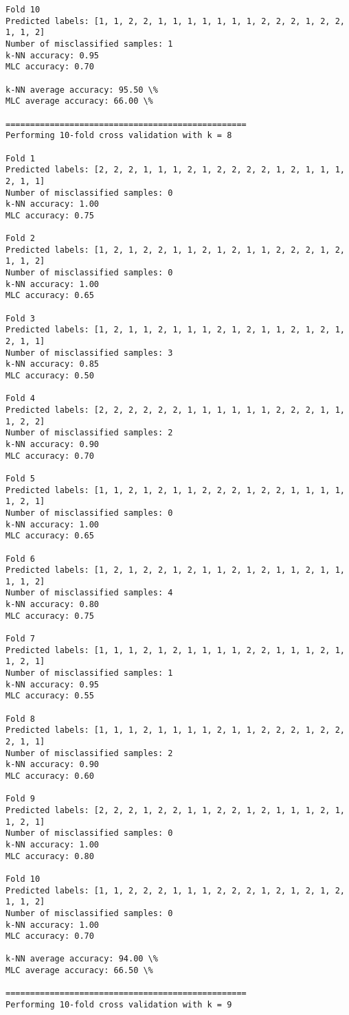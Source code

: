 \documentclass[11pt]{article}
\begin{document}
\begin{Verbatim}[commandchars=\\\{\}]
Fold 10
Predicted labels: [1, 1, 2, 2, 1, 1, 1, 1, 1, 1, 1, 2, 2, 2, 1, 2, 2, 1, 1, 2]
Number of misclassified samples: 1
k-NN accuracy: 0.95
MLC accuracy: 0.70

k-NN average accuracy: 95.50 \%
MLC average accuracy: 66.00 \%

=================================================
Performing 10-fold cross validation with k = 8

Fold 1
Predicted labels: [2, 2, 2, 1, 1, 1, 2, 1, 2, 2, 2, 2, 1, 2, 1, 1, 1, 2, 1, 1]
Number of misclassified samples: 0
k-NN accuracy: 1.00
MLC accuracy: 0.75

Fold 2
Predicted labels: [1, 2, 1, 2, 2, 1, 1, 2, 1, 2, 1, 1, 2, 2, 2, 1, 2, 1, 1, 2]
Number of misclassified samples: 0
k-NN accuracy: 1.00
MLC accuracy: 0.65

Fold 3
Predicted labels: [1, 2, 1, 1, 2, 1, 1, 1, 2, 1, 2, 1, 1, 2, 1, 2, 1, 2, 1, 1]
Number of misclassified samples: 3
k-NN accuracy: 0.85
MLC accuracy: 0.50

Fold 4
Predicted labels: [2, 2, 2, 2, 2, 2, 1, 1, 1, 1, 1, 1, 2, 2, 2, 1, 1, 1, 2, 2]
Number of misclassified samples: 2
k-NN accuracy: 0.90
MLC accuracy: 0.70

Fold 5
Predicted labels: [1, 1, 2, 1, 2, 1, 1, 2, 2, 2, 1, 2, 2, 1, 1, 1, 1, 1, 2, 1]
Number of misclassified samples: 0
k-NN accuracy: 1.00
MLC accuracy: 0.65

Fold 6
Predicted labels: [1, 2, 1, 2, 2, 1, 2, 1, 1, 2, 1, 2, 1, 1, 2, 1, 1, 1, 1, 2]
Number of misclassified samples: 4
k-NN accuracy: 0.80
MLC accuracy: 0.75

Fold 7
Predicted labels: [1, 1, 1, 2, 1, 2, 1, 1, 1, 1, 2, 2, 1, 1, 1, 2, 1, 1, 2, 1]
Number of misclassified samples: 1
k-NN accuracy: 0.95
MLC accuracy: 0.55

Fold 8
Predicted labels: [1, 1, 1, 2, 1, 1, 1, 1, 2, 1, 1, 2, 2, 2, 1, 2, 2, 2, 1, 1]
Number of misclassified samples: 2
k-NN accuracy: 0.90
MLC accuracy: 0.60

Fold 9
Predicted labels: [2, 2, 2, 1, 2, 2, 1, 1, 2, 2, 1, 2, 1, 1, 1, 2, 1, 1, 2, 1]
Number of misclassified samples: 0
k-NN accuracy: 1.00
MLC accuracy: 0.80

Fold 10
Predicted labels: [1, 1, 2, 2, 2, 1, 1, 1, 2, 2, 2, 1, 2, 1, 2, 1, 2, 1, 1, 2]
Number of misclassified samples: 0
k-NN accuracy: 1.00
MLC accuracy: 0.70

k-NN average accuracy: 94.00 \%
MLC average accuracy: 66.50 \%

=================================================
Performing 10-fold cross validation with k = 9


\end{Verbatim}
\end{document}
